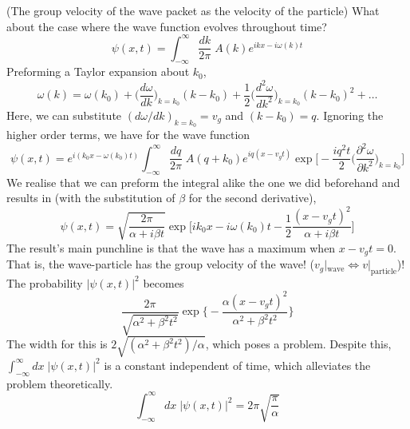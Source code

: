 \begin{thm}
(The group velocity of the wave packet as the velocity of the particle)
What about the case where the wave function evolves throughout time?
\[\psi (x,t)=\int ^{\infty }_{-\infty }\dfrac{dk}{2\pi }\;A(k)e^{ikx-i\omega (k)t}\]
Preforming a Taylor expansion about $k_0$, 
\[\omega (k)=\omega (k_0)+\Big(\dfrac{d \omega }{d k} \Big)_{k=k_0}(k-k_0)+\dfrac{1}{2}\Big(\dfrac{d ^2\omega }{d k^2} \Big)_{k=k_0}(k-k_0)^2+\ldots\]
Here, we can substitute $(d\omega /dk)_{k=k_0}=v_{g}$ and $(k-k_0)=q$. Ignoring the higher order terms, we have for the wave function
\[\psi (x,t)=e^{ i(k_0x-\omega (k_0)t)}\int_{-\infty }^{\infty }\dfrac{dq}{2\pi }\;A(q+k_0)e^{iq(x-v_{g}t)}\exp \Big[-\dfrac{iq^2t}{2}\Big(\dfrac{\partial^2 \omega }{\partial k^2}\Big)_{k=k_0} \Big]\]
We realise that we can preform the integral alike the one we did beforehand and results in (with the substitution of $\beta $ for the second derivative),
\[\psi (x,t)=\sqrt{\dfrac{2\pi }{\alpha +i\beta t}}\exp\Big[ik_0x-i\omega (k_0)t-\dfrac{1}{2}\dfrac{(x-v_{g}t)^2}{\alpha +i\beta t}\Big]\]
The result's main punchline is that the wave has a maximum when $x-v_{g}t=0$. That is, the wave-particle has the group velocity of the wave! ($v_{g}|_{\mathrm{wave}}\iff v|_{\mathrm{particle}}$)! The probability $|\psi  (x,t)|^2$ becomes
\[\dfrac{2\pi }{\sqrt{\alpha ^2+\beta^2 t^2}}\exp\Big\{-\dfrac{\alpha (x-v_{g}t)^2}{\alpha ^2+\beta ^2t^2}\Big\}\]
The width for this is $2\sqrt{(\alpha ^2+\beta ^2t^2)/\alpha }$, which poses a problem. Despite this, $\int^{\infty }_{-\infty } dx\;|\psi  (x,t)|^2$ is a constant independent of time, which alleviates the problem theoretically.
\[\int ^{\infty }_{-\infty }dx\;|\psi (x,t)|^2=2\pi \sqrt{\dfrac{\pi }{\alpha }}\]
\end{thm}
\vspace{2ex}

